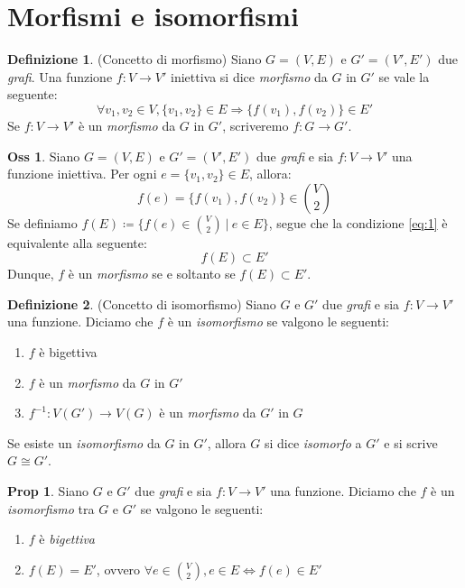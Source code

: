 \documentclass[12pt, a4paper]{report}
\theoremstyle{definition}
\newtheorem{definition}{Definizione}[section]
\newtheorem{observation}{Oss}[section]
\newtheorem*{proposition}{Prop}
\begin{document}
\section{Morfismi e isomorfismi}
\begin{definition}(Concetto di morfismo)
    Siano $G=(V,E)$ e $G'=(V',E')$ due \emph{grafi}. Una funzione \(f:V\to V'\)
    iniettiva si dice \emph{morfismo} da $G$ in $G'$ se vale la seguente:
    \begin{equation} \label{eq:1}
        \forall v_1,v_2\in V, \{v_1,v_2\}\in E\Rightarrow\{f(v_1),f(v_2)\}\in E'
    \end{equation}
    Se $f:V\to V'$ è un \emph{morfismo} da $G$ in $G'$, scriveremo $f:G\to G'$.
\end{definition}

\begin{observation}
    Siano $G=(V,E)$ e $G'=(V',E')$ due \emph{grafi} e sia \(f:V\to V'\) una
    funzione iniettiva. Per ogni $e=\{v_1,v_2\}\in E$, allora:
    \[f(e)=\{f(v_1),f(v_2)\}\in\binom{V}{2}\]
    Se definiamo $f(E)\coloneqq\{f(e)\in\binom{V}{2}\ |\ e\in E\}$, segue che la
    condizione \ref{eq:1} è equivalente alla seguente:
    \begin{equation} \label{eq:2}
        f(E)\subset E'    
    \end{equation}
    Dunque, $f$ è un \emph{morfismo} se e soltanto se $f(E)\subset E'$. 
\end{observation}

\begin{definition}(Concetto di isomorfismo)
    Siano $G$ e $G'$ due \emph{grafi} e sia $f:V\to V'$ una funzione. Diciamo che
    $f$ è un \emph{isomorfismo} se valgono le seguenti:
    \begin{enumerate}[label=(\roman*)]
        \item $f$ è bigettiva
        \item $f$ è un \emph{morfismo} da $G$ in $G'$
        \item $f^{-1}:V(G')\to V(G)$ è un \emph{morfismo} da $G'$ in $G$
    \end{enumerate}
    Se esiste un \emph{isomorfismo} da $G$ in $G'$, allora $G$ si dice
    \emph{isomorfo} a $G'$ e si scrive $G\cong G'$.
\end{definition}

\begin{proposition}
    Siano $G$ e $G'$ due \emph{grafi} e sia $f:V\to V'$ una funzione. Diciamo che
    $f$ è un \emph{isomorfismo} tra $G$ e $G'$ se valgono le seguenti:
    \begin{enumerate}[label=(\roman*)]
        \item $f$ è \emph{bigettiva}
        \item $f(E)=E'$, ovvero $\forall e\in\binom{V}{2},e\in E\Leftrightarrow f(e)\in E'$
    \end{enumerate}
\end{proposition}
\end{document}
